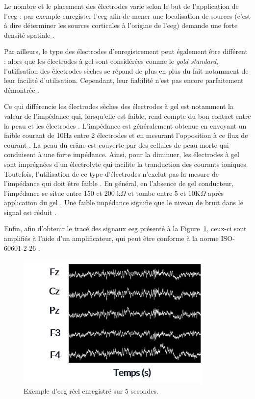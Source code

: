 Le nombre et le placement des électrodes varie selon le but de l'application de l'\gls{eeg} : par exemple enregister l'\gls{eeg} afin
de mener une localisation de sources (c'est à dire déterminer les sources corticales à l'origine de l'\gls{eeg}) demande une forte densité spatiale \citep{Lantz2003}. 

Par ailleurs, le type des électrodes d'enregistrement peut également être différent : 
alors que les électrodes à gel sont considérées comme le \textit{gold standard}, l'utilisation des électrodes sèches se répand de plus 
en plus du fait notamment de leur facilité d'utilisation. Cependant, leur fiabilité n'est pas encore parfaitement démontrée \citep{Lopez2014}. 

Ce qui différencie les électrodes sèches des électrodes à gel est notamment la valeur de l'impédance qui, lorsqu'elle est faible, rend compte du bon contact entre la peau et les électrodes \citep{Lopez2014}. 
L'impédance est généralement obtenue en envoyant un faible courant de 10Hz entre 2 électrodes et en mesurant l'opposition à ce flux de courant \citep{Kappenman2010}. La peau du crâne est 
couverte par des cellules de peau morte qui conduisent à une forte impédance.
Ainsi, pour la diminuer, les électrodes à gel sont imprégnées d'un électrolyte qui facilite la tranduction des courants ioniques. Toutefois, l'utilisation de ce type d'électrodes 
n'exclut pas la mesure de l'impédance qui doit être faible \citep{Lopez2014}. En général, en l'absence de gel conducteur, l'impédance se
situe entre 150 et 200 k$\Omega$ et tombe entre 5 et 10K$\Omega$ après application du gel \citep{Lopez2014}. Une faible impédance signifie 
que le niveau de bruit dans le signal est réduit \citep{Kappenman2010}.

Enfin, afin d'obtenir le tracé des signaux \gls{eeg} présenté à la Figure~\ref{Figure:introduction_eeg_example}, ceux-ci sont amplifiés 
à l'aide d'un amplificateur, qui peut être conforme à la norme ISO-60601-2-26 \citep{ISO}. 

\begin{figure}[h!]
  \centering
	\includegraphics[width=0.5\linewidth]{figures/chapter-1/introduction-eeg-example} 
  \caption{Exemple d'\gls{eeg} réel enregistré sur 5 secondes. }
  \label{Figure:introduction_eeg_example}
\end{figure}

